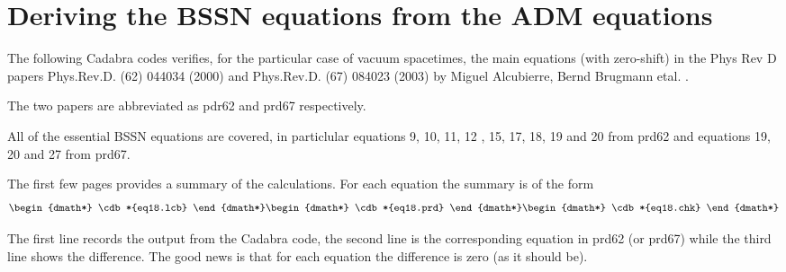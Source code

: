 \documentclass[12pt]{cdblatex}
\begin{document}















\section*{Deriving the BSSN equations from the ADM equations}

The following Cadabra codes verifies, for the particular case of vacuum spacetimes,
the main equations (with zero-shift) in the Phys Rev D papers Phys.Rev.D. (62) 044034 (2000) and
Phys.Rev.D. (67) 084023 (2003) by Miguel Alcubierre, Bernd Brugmann etal. .

The two papers are abbreviated as pdr62 and prd67 respectively.

All of the essential BSSN equations are covered, in particlular equations
9, 10, 11, 12 , 15, 17, 18, 19 and 20 from prd62 and equations 19, 20 and 27 from
prd67.

The first few pages provides a summary of the calculations. For each equation the
summary is of the form
%
\begin{dgroup*}
   \begin{dmath*} \cdb*{eq18.lcb} \end{dmath*}
   \begin{dmath*} \cdb*{eq18.prd} \end{dmath*}
   \begin{dmath*} \cdb*{eq18.chk} \end{dmath*}
\end{dgroup*}

The first line records the output from the Cadabra code, the second line is the
corresponding equation in prd62 (or prd67) while the third line shows the difference.
The good news is that for each equation the difference is zero (as it should be).
\end{document}
